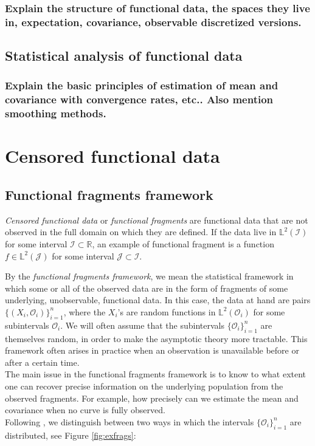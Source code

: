 \documentclass[10pt, a4paper]{report}
\newcommand{\Ll}[0]{\mathbb{L}}
\newcommand{\R}[0]{\mathbb{R}}
\theoremstyle{definition}
\theoremstyle{remark}
\begin{document}
\subsection{Explain the structure of functional data, the spaces they live in, expectation, covariance, observable discretized versions. }
\section{Statistical analysis of functional data}
\subsection{Explain the basic principles of estimation of mean and covariance with convergence rates, etc.. Also mention smoothing methods. }

\chapter{Censored functional data}\label{chap:frags}
\section{Functional fragments framework}\label{introfrag}
\textit{Censored functional data} or \textit{functional fragments} are functional data that are not observed in the full domain on which they are defined. If the data live in $\Ll^2(\mathcal{I})$ for some interval $\mathcal{I} \subset \R$, an example of functional fragment is a function $f \in \Ll^2(\mathcal{J})$ for some interval $\mathcal{J}\subset \mathcal{I}$.

By the \textit{functional fragments framework}, we mean the statistical framework in which some or all of the observed data are in the form of fragments of some underlying, unobservable, functional data. In this case, the data at hand are pairs $\{(X_i,\mathcal{O}_i)\}_{i=1}^n$, where the $X_i$'s are random functions in $\Ll^2(\mathcal{O}_i)$ for some subintervals $\mathcal{O}_i$. We will often assume that the subintervals $\{\mathcal{O}_i\}_{i=1}^n$ are themselves random, in order to make the asymptotic theory more tractable. This framework often arises in practice when an observation is unavailable before or after a certain time.\\
The main issue in the functional fragments framework is to know to what extent one can recover precise information on the underlying population from the observed fragments. For example, how precisely can we estimate the mean and covariance when no curve is fully observed.\\
Following \cite{DP2}, we distinguish between two ways in which the intervals $\{\mathcal{O}_i\}_{i=1}^n$ are distributed, see Figure \ref{fig:exfrags}:\\
\end{document}
